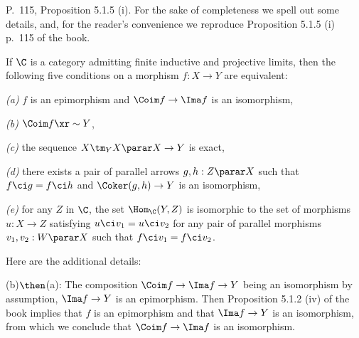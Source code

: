 \documentclass[12pt]{article}
\theoremstyle{remark}
\theoremstyle{definition}
\begin{document}
\begin{s}%
P.~115, Proposition 5.1.5 (i). For the sake of completeness we spell out some details, and, for the reader's convenience we reproduce Proposition 5.1.5 (i) p.~115 of the book. 

\begin{prop}[Proposition 5.1.5 (i) p.~115] 
If $\C$ is a category admitting finite inductive and projective limits, then the following five conditions on a morphism $f:X\to Y$ are equivalent:

\nn\emph{(a)} $f$ is an epimorphism and $\Coim f\to\Ima f$ is an isomorphism,

\nn\emph{(b)} $\Coim f\xr\sim Y$,

\nn\emph{(c)} the sequence $X\tm_YX\parar X\to Y$ is exact,

\nn\emph{(d)} there exists a pair of parallel arrows $g,h:Z\parar X$ such that $f\ci g=f\ci h$ and $\Coker(g,h)\to Y$ is an isomorphism,

\nn\emph{(e)} for any $Z$ in $\C$, the set $\Hom_\C(Y,Z)$ is isomorphic to the set of morphisms $u:X\to Z$ satisfying $u\ci v_1=u\ci v_2$ for any pair of parallel morphisms $v_1,v_2:W\parar X$ such that $f\ci v_1=f\ci v_2$. 
\end{prop} 

Here are the additional details: 

\nn(b)$\then$(a): The composition $\Coim f\to\Ima f\to Y$ being an isomorphism by assumption, $\Ima f\to Y$ is an epimorphism. Then Proposition 5.1.2 (iv) of the book implies that $f$ is an epimorphism and that $\Ima f\to Y$ is an isomorphism, from which we conclude that $\Coim f\to\Ima f$ is an isomorphism.


\end{s}
\end{document}
